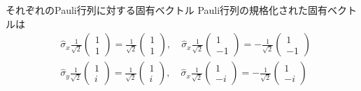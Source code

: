 \documentclass{jsarticle}  %
\numberwithin{equation}{section} %
\numberwithin{figure}{section}
\begin{document}
    \begin{itembox}[l]{\large{それぞれのPauli行列に対する固有ベクトル}}
        Pauli行列の規格化された固有ベクトルは
        \begin{align}
            &\hat{\sigma}_x \frac{1}{\sqrt{2}}
            \left(
            \begin{matrix}
                1\\
                1
            \end{matrix}
            \right) = \frac{1}{\sqrt{2}}
            \left(
            \begin{matrix}
                1\\
                1
            \end{matrix}
            \right),\quad
            \hat{\sigma}_x \frac{1}{\sqrt{2}}
            \left(
            \begin{matrix}
                1\\
                -1
            \end{matrix}
            \right) = -
            \frac{1}{\sqrt{2}}
            \left(
            \begin{matrix}
                1\\
                -1
            \end{matrix}
            \right) \\
            &\hat{\sigma}_y \frac{1}{\sqrt{2}}
            \left(
            \begin{matrix}
                1\\
                i
            \end{matrix}
            \right) = \frac{1}{\sqrt{2}}
            \left(
            \begin{matrix}
                1\\
                i
            \end{matrix}
            \right),\quad
            \hat{\sigma}_x \frac{1}{\sqrt{2}}
            \left(
            \begin{matrix}
                1\\
                -i
            \end{matrix}
            \right) = -
            \frac{1}{\sqrt{2}}
            \left(
            \begin{matrix}
                1\\
                -i
            \end{matrix}
            \right) \\

\end{align}
\end{itembox}
\end{document}
